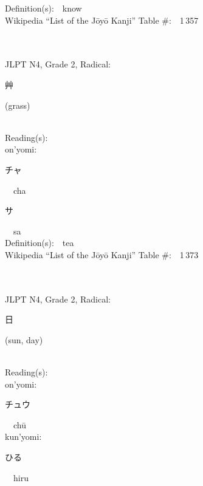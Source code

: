 \begin{multicols}{2}
Definition(s):\ \ know \\
Wikipedia ``List of the J\=oy\=o Kanji'' Table \#:\ \ 1\,357 \\
\ \ \\
{\fontsize{34pt}{40pt}  }\ \ \\  %
{JLPT N4, Grade 2, Radical:\ \ {\begin{CJK}{UTF8}{min} 艸 \end{CJK}} (grass) } \\
Reading(s):\ \ \\
{\hspace*{1em}}on'yomi:\ \ \\
{\hspace*{2em}}{\begin{CJK}{UTF8}{min} チャ \end{CJK}}\ \ cha\ \ \\
{\hspace*{2em}}{\begin{CJK}{UTF8}{min} サ \end{CJK}}\ \ sa\ \ \\
Definition(s):\ \ tea \\
Wikipedia ``List of the J\=oy\=o Kanji'' Table \#:\ \ 1\,373 \\
\ \ \\
{\fontsize{34pt}{40pt}  }\ \ \\  %
{JLPT N4, Grade 2, Radical:\ \ {\begin{CJK}{UTF8}{min} 日 \end{CJK}} (sun, day) } \\
Reading(s):\ \ \\
{\hspace*{1em}}on'yomi:\ \ \\
{\hspace*{2em}}{\begin{CJK}{UTF8}{min} チュウ \end{CJK}}\ \ ch\=u\ \ \\
{\hspace*{1em}}kun'yomi:\ \ \\
{\hspace*{2em}}{\begin{CJK}{UTF8}{min} ひる \end{CJK}}\ \ hiru\ \ \\

\end{multicols}
